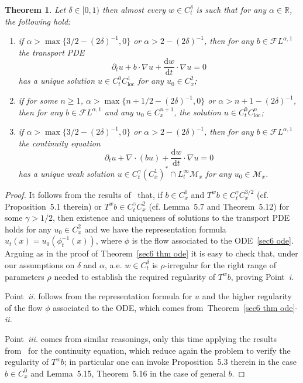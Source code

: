 \documentclass[10pt]{article}
\newcommand{\mathd}{\mathrm{d}}
\newcommand{\tmop}[1]{\ensuremath{\operatorname{#1}}}
\newcommand{\tmtextit}[1]{{\itshape{#1}}}
\newtheorem{theorem}{Theorem}%
\begin{document}
\begin{theorem}
  \label{sec6 thm transport}Let $\delta \in [0, 1)$ then almost every $w \in
  C^{\delta}_t$ is such that for any $\alpha \in \mathbb{R}$, the following
  hold:
  \begin{enumerate}[label=\roman*.]
    \item if $\alpha > \max \{ 3 / 2 - (2 \delta)^{- 1}, 0 \}$ or $\alpha > 2
    - (2 \delta)^{- 1}$, then for any $b \in \mathcal{F} L^{\alpha, 1}$ the
    transport PDE
    \[ \partial_t u + b \cdot \nabla u + \frac{\mathd w}{\mathd t} \cdot
       \nabla u = 0 \]
    has a unique solution $u \in C^0_t C^1_{\tmop{loc}}$ for any $u_0 \in
    C^2_x$;
    
    \item if for some $n\geqslant 1$, $\alpha > \max \{ n + 1 / 2 - (2 \delta)^{- 1}, 0 \}$ or $\alpha
    > n + 1 - (2 \delta)^{- 1}$, then for any $b \in \mathcal{F} L^{\alpha,
    1}$ and any $u_0 \in C^{n + 1}_x$, the solution $u \in C^0_t
    C^n_{\tmop{loc}}$;
    
    \item if $\alpha > \max \{ 3 / 2 - (2 \delta)^{- 1}, 0 \}$ or $\alpha > 2
    - (2 \delta)^{- 1}$, then for any $b \in \mathcal{F} L^{\alpha, 1}$ the
    continuity equation
    \[ \partial_t u + \nabla \cdot (b u) + \frac{\mathd w}{\mathd t} \cdot
       \nabla u = 0 \]
    has a unique weak solution $u \in C^{\gamma}_t (C^1_x)^{\ast} \cap
    L^{\infty}_t \mathcal{M}_x$ for any $u_0 \in \mathcal{M}_x$.
  \end{enumerate}
\end{theorem}

\begin{proof}
  It follows from the results of~{\cite{galeatigubinelli_ode}} that, if $b \in
  C^0_x$ and $T^w b \in C^{\gamma}_t C^{3 / 2}_x$ (cf. Proposition~5.1
  therein) or $T^w b \in C^{\gamma}_t C^2_x$ (cf. Lemma~5.7 and Theorem~5.12)
  for some $\gamma > 1 / 2$, then existence and uniqueness of solutions to the
  transport PDE holds for any $u_0 \in C^2_x$ and we have the representation
  formula $u_t (x) = u_0 (\phi^{- 1}_t (x))$, where $\phi$ is the flow
  associated to the ODE~\eqref{sec6 ode}. Arguing as in the proof of
  Theorem~\ref{sec6 thm ode} it is easy to check that, under our assumptions
  on $\delta$ and $\alpha$, a.e. $w \in C^{\delta}_t$ is
  $\rho$\mbox{-}irregular for the right range of parameters $\rho$ needed to
  establish the required regularity of $T^w b$, proving Point~\tmtextit{i.}
  
  Point~\tmtextit{ii.} follows from the representation formula for $u$ and the
  higher regularity of the flow $\phi$ associated to the ODE, which comes
  from~Theorem~\ref{sec6 thm ode}\mbox{-}\tmtextit{ii.}
  
  Point~\tmtextit{iii.} comes from similar reasonings, only this time applying
  the results from~{\cite{galeatigubinelli_ode}} for the continuity equation,
  which reduce again the problem to verify the regularity of $T^w b$; in
  particular one can invoke Proposition~5.3 therein in the case $b \in C^0_x$
  and Lemma~5.15, Theorem~5.16 in the case of general $b$.
\end{proof}
\end{document}

